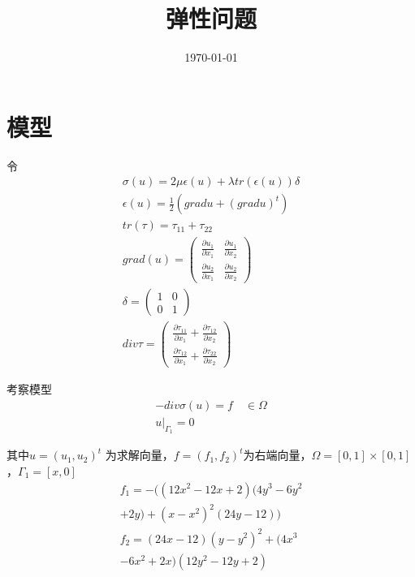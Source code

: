 \documentclass[UTF8,titlepage,twocolumn]{ctexart}
\title{弹性问题}
\date{\today}
\begin{document}
\maketitle

\section{模型}

令
$$
\begin{matrix}
	\sigma(u) = 2 \mu \epsilon(u) + \lambda tr(\epsilon(u)) \delta \\
	\epsilon(u) = \frac{1}{2} (grad u + (grad u)^t) \\
	tr(\tau) = \tau_{11} + \tau_{22} \\
	grad(u) = \begin{pmatrix}
		\frac{\partial u_1}{\partial x_1} & \frac{\partial u_1}{\partial x_2} \\
		\frac{\partial u_2}{\partial x_1} &
		\frac{\partial u_2}{\partial x_2}
	\end{pmatrix} \\
	\delta = \begin{pmatrix}
		1 & 0 \\
		0 & 1
	\end{pmatrix} \\
	div \tau = \begin{pmatrix}
		\frac{\partial \tau_{11}}{\partial x_1} + \frac{\partial \tau_{12}}{\partial x_2} \\
		\frac{\partial \tau_{12}}{\partial x_1} + \frac{\partial \tau_{22}}{\partial x_2}
	\end{pmatrix}
\end{matrix}
$$

考察模型
$$
\begin{matrix}
	-div \sigma(u) = f \quad \in \Omega  \\
	u |_{\Gamma_1} = 0
\end{matrix}
$$ 
\par
其中$ u = (u_1,u_2)^t $ 为求解向量，$ f = (f_1,f_2)^t $为右端向量，$ \Omega = [0,1] \times [0,1] $，$\Gamma_1 = [x,0]$
$$
\begin{matrix}
	f_1 = -((12 x^2 - 12 x + 2) (4 y^3 - 6 y^2 
	\\ 
	+ 2 y) + (x - x^2)^2 (24 y - 12)) 
	\\
	f_2 = (24 x - 12)(y - y^2)^2 + (4 x^3 
	\\
	- 6 x^2 + 2 x) (12 y^2 - 12 y + 2)
\end{matrix}
$$
\end{document}
